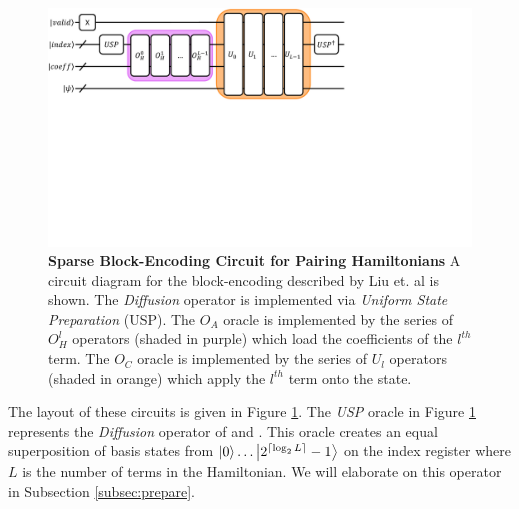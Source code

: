 \begin{figure}[h]
    \includegraphics[width=12cm]{figures/liu-construction.pdf}
    \caption{
        \textbf{Sparse Block-Encoding Circuit for Pairing Hamiltonians}
        A circuit diagram for the block-encoding described by Liu et. al \cite{liu2024efficient} is shown.
        The \textit{Diffusion} operator is implemented via \textit{Uniform State Preparation} (USP).
        The $O_A$ oracle is implemented by the series of $O_H^l$ operators (shaded in purple) which load the coefficients of the $l^{th}$ term.
        The $O_C$ oracle is implemented by the series of $U_l$ operators (shaded in orange) which apply the $l^{th}$ term onto the state.
    }
    \label{fig:liu-construction}
\end{figure}

The layout of these circuits is given in Figure \ref{fig:liu-construction}.
The \textit{USP} oracle in Figure \ref{fig:liu-construction} represents the \textit{Diffusion} operator of \cite{camps2024explicit} and \cite{liu2024efficient}.
This oracle creates an equal superposition of basis states from $\ket{0}\dots \ket{2^{\lceil \log_2{L} \rceil} - 1}$ on the index register where $L$ is the number of terms in the Hamiltonian.
We will elaborate on this operator in Subsection \ref{subsec:prepare}.

